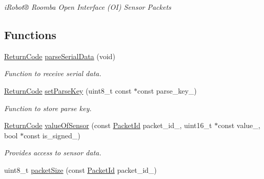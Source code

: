 \begin{DoxyCompactItemize}
\begin{DoxyCompactList}\small\item\em i\+Robot® Roomba Open Interface (O\+I) Sensor Packets \end{DoxyCompactList}\end{DoxyCompactItemize}
\subsection*{Functions}
\begin{DoxyCompactItemize}
\item 
\hyperlink{namespaceroomba_1_1series500_1_1oi_1_1sensors_afedb9083158162092444b523e0a32ebb}{Return\+Code} \hyperlink{namespaceroomba_1_1series500_1_1oi_1_1sensors_a55e703cd451e199cd600a41230239de7}{parse\+Serial\+Data} (void)
\begin{DoxyCompactList}\small\item\em Function to receive serial data. \end{DoxyCompactList}\item 
\hyperlink{namespaceroomba_1_1series500_1_1oi_1_1sensors_afedb9083158162092444b523e0a32ebb}{Return\+Code} \hyperlink{namespaceroomba_1_1series500_1_1oi_1_1sensors_aad9d5021c285d0aa1382be994ccdc841}{set\+Parse\+Key} (uint8\+\_\+t const $\ast$const parse\+\_\+key\+\_\+)
\begin{DoxyCompactList}\small\item\em Function to store parse key. \end{DoxyCompactList}\item 
\hyperlink{namespaceroomba_1_1series500_1_1oi_1_1sensors_afedb9083158162092444b523e0a32ebb}{Return\+Code} \hyperlink{namespaceroomba_1_1series500_1_1oi_1_1sensors_a670e21671d8c2923a3fbac6e7ebc28eb}{value\+Of\+Sensor} (const \hyperlink{namespaceroomba_1_1series500_1_1oi_1_1sensors_a909f47d40452d1cabb85eef642ac04b6}{Packet\+Id} packet\+\_\+id\+\_\+, uint16\+\_\+t $\ast$const value\+\_\+, bool $\ast$const is\+\_\+signed\+\_\+)
\begin{DoxyCompactList}\small\item\em Provides access to sensor data. \end{DoxyCompactList}\item 
uint8\+\_\+t \hyperlink{namespaceroomba_1_1series500_1_1oi_1_1sensors_a63498ea1417feb6c390694f752277641}{packet\+Size} (const \hyperlink{namespaceroomba_1_1series500_1_1oi_1_1sensors_a909f47d40452d1cabb85eef642ac04b6}{Packet\+Id} packet\+\_\+id\+\_\+)
\end{DoxyCompactItemize}
